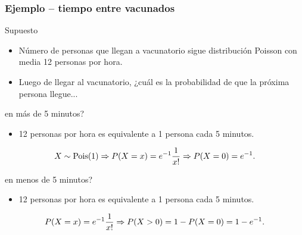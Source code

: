\documentclass[table]{beamer}
\begin{document}
\begin{frame}
    \frametitle{Ejemplo -- tiempo entre vacunados}
    \begin{block}{Supuesto}
        \begin{itemize}
            \item Número de personas que llegan a vacunatorio sigue distribución Poisson con media 12 personas por hora.
            \item Luego de llegar al vacunatorio, ¿cuál es la probabilidad de que la próxima persona llegue...
        \end{itemize}
    \end{block}
    \begin{block}{en más de 5 minutos?}
        \begin{itemize}
            \item 12 personas por hora es equivalente a 1 persona cada 5 minutos.
        \end{itemize}
        \begin{equation*}
            X \sim \poisson{1} \Rightarrow \prob{X = x} = e^{- 1} \frac{1}{x!}
            \Rightarrow \prob{X = 0} = e^{- 1} .
        \end{equation*}
    \end{block}
    \begin{block}{en menos de 5 minutos?}
        \begin{itemize}
            \item 12 personas por hora es equivalente a 1 persona cada 5 minutos.
        \end{itemize}
        \begin{equation*}
            \prob{X = x} = e^{- 1} \frac{1}{x!}
            \Rightarrow \prob{X > 0} = 1 - \prob{X = 0} = 1 - e^{- 1} .
        \end{equation*}
    \end{block}
\end{frame}
\end{document}
